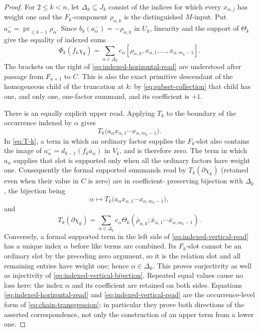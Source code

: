 \documentclass[11pt]{amsart}
\theoremstyle{remark}
\newcommand{\pr}{\operatorname{pr}}
\begin{document}
\begin{proof}
	For $2\leq k<n$, let $\Delta_k\subseteq J_k$ consist of the indices for
	which every $x_{\alpha,j}$ has weight one and the $F_k$-component
	$\rho_{\alpha,k}$ is the distinguished $M$-input.  Put
	$a^-_\alpha=\pr_{\leq k-1}\rho_\alpha$.  Since
	$b_k(a^-_\alpha)=-\rho_{\alpha,k}$ in $U_k$, linearity and the support
	of $\Theta_k$ give the equality of indexed sums
	\begin{equation}\label{eq:indexed-horizontal-read}
	 \Phi_k(f_k\chi_k)=
	 \sum_{\alpha\in\Delta_k}c_\alpha
	 [\rho_{\alpha,k},x_{\alpha,1},\ldots,
	                         x_{\alpha,m_k-1}].
	\end{equation}
	The brackets on the right of \eqref{eq:indexed-horizontal-read} are
	understood after passage from $F_{n+1}$ to $C$.
	This is also the exact primitive descendant of the homogeneous child of
	the truncation at $k$: by \eqref{eq:subset-collection} that child has
	one, and only one, one-factor summand, and its coefficient is $+1$.

	There is an equally explicit upper read.  Applying $T_k$ to the
	boundary of the occurrence indexed by $\alpha$ gives
	\[
	 T_k\bigl(a_\alpha x_{\alpha,1}\cdots
	                   x_{\alpha,m_k-1}\bigr).
	\]
	In \eqref{eq:T-k}, a term in which an ordinary factor supplies the
	$F_k$-slot also contains the image of
	$a^-_\alpha=d_{k-1}(f_k a_\alpha)$ in $V_k$, and is therefore zero.
	The term in which $a_\alpha$ supplies that slot is supported only when all
	the ordinary factors have weight one.  Consequently the formal supported
	summands read by $T_k(\partial\chi_k)$ (retained even
	when their value in $C$ is zero) are in coefficient-
	preserving bijection with $\Delta_k$, the bijection being
	\begin{equation}\label{eq:indexed-vertical-bijection}
	 \alpha\longmapsto
	 T_k\bigl(a_\alpha x_{\alpha,1}\cdots
	                   x_{\alpha,m_k-1}\bigr),
	\end{equation}
	and
	\begin{equation}\label{eq:indexed-vertical-read}
	 T_k(\partial\chi_k)=
	 \sum_{\alpha\in\Delta_k}c_\alpha
	\Theta_k(\bar\rho_{\alpha,k};
	       \bar x_{\alpha,1}\cdots\bar x_{\alpha,m_k-1}).
	\end{equation}
	Conversely, a formal supported term in the left side of
	\eqref{eq:indexed-vertical-read} has a unique index $\alpha$ before like
	terms are combined.  Its $F_k$-slot cannot be an ordinary slot by the
	preceding zero argument, so it is the relation slot and all remaining
	entries have weight one; hence $\alpha\in\Delta_k$.  This proves
	surjectivity as well as injectivity of
	\eqref{eq:indexed-vertical-bijection}.
	Repeated equal values cause no loss here: the index $\alpha$ and its
	coefficient are retained on both sides.  Equations
	\eqref{eq:indexed-horizontal-read} and
	\eqref{eq:indexed-vertical-read} are the occurrence-level form of
	\eqref{eq:chain-transgression}; in particular they prove both directions
	of the asserted correspondence, not only the construction of an upper
	term from a lower one.


\end{proof}
\end{document}
